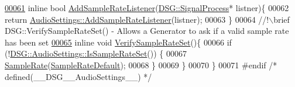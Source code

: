 \begin{DoxyCode}
\hypertarget{_audio_settings_8h_source_l00061}{}\hyperlink{namespace_d_s_g_a66af6119635fe556dc5f840bf78dec56}{00061} \textcolor{comment}{}    \textcolor{keyword}{inline} \textcolor{keywordtype}{bool} \hyperlink{namespace_d_s_g_a66af6119635fe556dc5f840bf78dec56}{AddSampleRateListener}(\hyperlink{class_d_s_g_1_1_signal_process}{DSG::SignalProcess}* listner)\{
00062         \textcolor{keywordflow}{return} \hyperlink{class_d_s_g_1_1_audio_settings_ad60a89fec20cf5fd19d90fec1768dbae}{AudioSettings::AddSampleRateListener}(listner);
00063     \}\textcolor{comment}{}
00064 \textcolor{comment}{    //!\(\backslash\)brief DSG::VerifySampleRateSet() - Allows a Generator to ask if a valid sample rate has been set}
\hypertarget{_audio_settings_8h_source_l00065}{}\hyperlink{namespace_d_s_g_a0749755eb0ed01894adc60fab768dfa5}{00065} \textcolor{comment}{}    \textcolor{keyword}{inline} \textcolor{keywordtype}{void} \hyperlink{namespace_d_s_g_a0749755eb0ed01894adc60fab768dfa5}{VerifySampleRateSet}()\{
00066         \textcolor{keywordflow}{if} (!\hyperlink{class_d_s_g_1_1_audio_settings_a5ff952756264670e4f3ca3661b4f9144}{DSG::AudioSettings::IsSampleRateSet}()) \{
00067             \hyperlink{namespace_d_s_g_a72df05177db0412c3590070923f62819}{SampleRate}(\hyperlink{_audio_settings_8h_ad9d89453f9b7b69bd9beb58946863dd4}{SampleRateDefault});
00068         \}
00069     \}
00070 \}
00071 \textcolor{preprocessor}{#endif }\textcolor{comment}{/* defined(\_\_DSG\_\_AudioSettings\_\_) */}\textcolor{preprocessor}{}
\end{DoxyCode}
